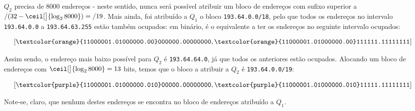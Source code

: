 \begin{enumerate}[leftmargin=\labelsep]

        $Q_2$ precisa de 8000 endereços - neste sentido, nunca será possível atribuir
        um bloco de endereços com sufixo superior a $/(32 - \ceil[\big]{\log_2{8000}}) = /19$.
        Mais ainda, foi atribuído a $Q_1$ o bloco \texttt{193.64.0.0/18}, pelo
        que todos os endereços no intervalo \texttt{193.64.0.0} a \texttt{193.64.63.255}
        estão também ocupados: em binário, é o equivalente a ter os endereços no
        seguinte intervalo ocupados:

        $$
          [\texttt{\textcolor{orange}{11000001.01000000.00}000000.00000000}, \texttt{\textcolor{orange}{11000001.01000000.00}111111.11111111}]
        $$

        Assim sendo, o endereço mais baixo possível para $Q_2$ é \texttt{193.64.64.0},
        já que todos os anteriores estão ocupados. Alocando um bloco de endereços com
        $\ceil[\big]{\log_2{8000}} = 13$ bits, temos que o bloco a atribuir a $Q_2$ é
        \texttt{193.64.0.0/19}:

        $$
          [\texttt{\textcolor{purple}{11000001.01000000.010}00000.00000000}, \texttt{\textcolor{purple}{11000001.01000000.010}11111.11111111}]
        $$

        Note-se, claro, que nenhum destes endereços se encontra no bloco de endereços
        atribuído a $Q_1$.


\end{enumerate}